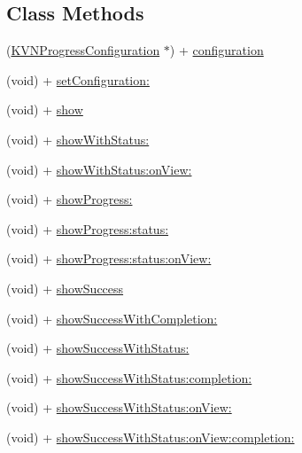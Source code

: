 \subsection*{Class Methods}
\begin{DoxyCompactItemize}
\item 
(\mbox{\hyperlink{interface_k_v_n_progress_configuration}{K\+V\+N\+Progress\+Configuration}} $\ast$) + \mbox{\hyperlink{interface_k_v_n_progress_aaba9484a867f6da9cb051da337161d15}{configuration}}
\item 
(void) + \mbox{\hyperlink{interface_k_v_n_progress_ab00ed30bcc9ef7e6517f27554d570bf9}{set\+Configuration\+:}}
\item 
(void) + \mbox{\hyperlink{interface_k_v_n_progress_ad27933d0b2a65108404a514029689fb8}{show}}
\item 
(void) + \mbox{\hyperlink{interface_k_v_n_progress_af86acbff98a05f0ee39e746628b02022}{show\+With\+Status\+:}}
\item 
(void) + \mbox{\hyperlink{interface_k_v_n_progress_ae317161c16121fa1b3dcdb9c1e9f7a8f}{show\+With\+Status\+:on\+View\+:}}
\item 
(void) + \mbox{\hyperlink{interface_k_v_n_progress_abc53102e1cb121a8b38c3337ce372517}{show\+Progress\+:}}
\item 
(void) + \mbox{\hyperlink{interface_k_v_n_progress_a2c58c4d42f018ef3efbb163f6390004e}{show\+Progress\+:status\+:}}
\item 
(void) + \mbox{\hyperlink{interface_k_v_n_progress_a57a53b4b0ddb93f604d24c50ec9c0602}{show\+Progress\+:status\+:on\+View\+:}}
\item 
(void) + \mbox{\hyperlink{interface_k_v_n_progress_a3b92c0b7eeebe3537ba37d7f56c5b2bb}{show\+Success}}
\item 
(void) + \mbox{\hyperlink{interface_k_v_n_progress_aa5757d5457364be1b1a03224c934ff32}{show\+Success\+With\+Completion\+:}}
\item 
(void) + \mbox{\hyperlink{interface_k_v_n_progress_ae9b8b57302f6a4456658e758784790bf}{show\+Success\+With\+Status\+:}}
\item 
(void) + \mbox{\hyperlink{interface_k_v_n_progress_aa4d2366ad5664f42a3c9214f97e4d373}{show\+Success\+With\+Status\+:completion\+:}}
\item 
(void) + \mbox{\hyperlink{interface_k_v_n_progress_a86fcdede3818f360abfae851a7b1b7fc}{show\+Success\+With\+Status\+:on\+View\+:}}
\item 
(void) + \mbox{\hyperlink{interface_k_v_n_progress_a622aa6249f5eafaa2b61058bfe2f2d61}{show\+Success\+With\+Status\+:on\+View\+:completion\+:}}

\end{DoxyCompactItemize}
